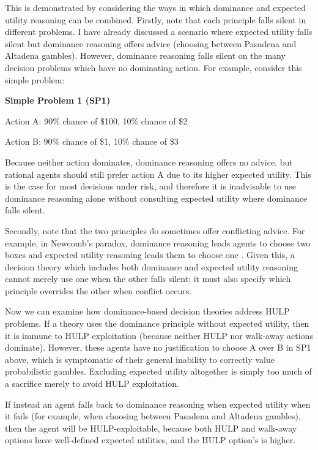 \documentclass{article}
\begin{document}
This is demonstrated by considering the ways in which dominance and expected utility reasoning can be combined. Firstly, note that each principle falls silent in different problems. I have already discussed a scenario where expected utility falls silent but dominance reasoning offers advice (choosing between Pasadena and Altadena gambles). However, dominance reasoning falls silent on the many decision problems which have no dominating action. For example, consider this simple problem:

\begin{center}
\textbf{Simple Problem 1 (SP1)}

Action A: 90\% chance of \$100, 10\% chance of \$2

Action B: 90\% chance of \$1, 10\% chance of \$3
\end{center}

Because neither action dominates, dominance reasoning offers no advice, but rational agents should still prefer action A due to its higher expected utility. This is the case for most decisions under risk, and therefore it is inadvisable to use dominance reasoning alone without consulting expected utility where dominance falls silent.

Secondly, note that the two principles do sometimes offer conflicting advice. For example, in Newcomb's paradox, dominance reasoning leads agents to choose two boxes and expected utility reasoning leads them to choose one \citep[pg. 110]{resnik1987choices}. Given this, a decision theory which includes both dominance and expected utility reasoning cannot merely use one when the other falls silent: it must also specify which principle overrides the other when conflict occurs.

Now we can examine how dominance-based decision theories address HULP problems. If a theory uses the dominance principle without expected utility, then it is immune to HULP exploitation (because neither HULP nor walk-away actions dominate). However, these agents have no justification to choose A over B in SP1 above, which is symptomatic of their general inability to correctly value probabilistic gambles. Excluding expected utility altogether is simply too much of a sacrifice merely to avoid HULP exploitation.

If instead an agent falls back to dominance reasoning when expected utility when it fails (for example, when choosing between Pasadena and Altadena gambles), then the agent will be HULP-exploitable, because both HULP and walk-away options have well-defined expected utilities, and the HULP option's is higher.
\end{document}
